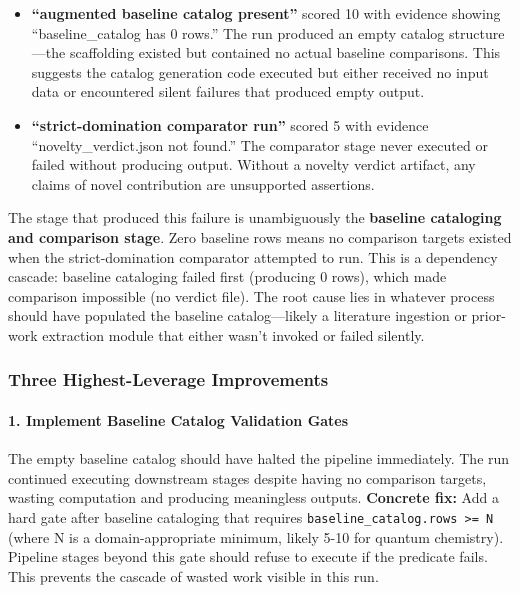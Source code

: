 \documentclass[10pt,letterpaper]{article}
\begin{document}
\begin{itemize}
\item
  \textbf{``augmented baseline catalog present''} scored 10 with evidence showing ``baseline\_catalog has 0 rows.'' The run produced an empty catalog structure---the scaffolding existed but contained no actual baseline comparisons. This suggests the catalog generation code executed but either received no input data or encountered silent failures that produced empty output.
\item
  \textbf{``strict-domination comparator run''} scored 5 with evidence ``novelty\_verdict.json not found.'' The comparator stage never executed or failed without producing output. Without a novelty verdict artifact, any claims of novel contribution are unsupported assertions.
\end{itemize}

The stage that produced this failure is unambiguously the \textbf{baseline cataloging and comparison stage}. Zero baseline rows means no comparison targets existed when the strict-domination comparator attempted to run. This is a dependency cascade: baseline cataloging failed first (producing 0 rows), which made comparison impossible (no verdict file). The root cause lies in whatever process should have populated the baseline catalog---likely a literature ingestion or prior-work extraction module that either wasn't invoked or failed silently.

\hypertarget{three-highest-leverage-improvements}{%
\subsubsection{Three Highest-Leverage Improvements}\label{three-highest-leverage-improvements}}

\hypertarget{implement-baseline-catalog-validation-gates}{%
\paragraph{1. Implement Baseline Catalog Validation Gates}\label{implement-baseline-catalog-validation-gates}}

The empty baseline catalog should have halted the pipeline immediately. The run continued executing downstream stages despite having no comparison targets, wasting computation and producing meaningless outputs. \textbf{Concrete fix:} Add a hard gate after baseline cataloging that requires \texttt{baseline\_catalog.rows\ \textgreater{}=\ N} (where N is a domain-appropriate minimum, likely 5-10 for quantum chemistry). Pipeline stages beyond this gate should refuse to execute if the predicate fails. This prevents the cascade of wasted work visible in this run.
\end{document}

